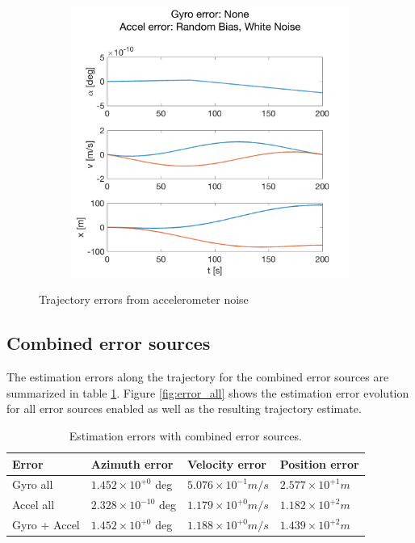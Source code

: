 \documentclass{article}
\newcommand{\e}[1]{\times 10^{#1}} %
\begin{document}
\begin{figure}[H]
\begin{subfigure}[t]{0.49\textwidth}
        \caption{}
    \end{subfigure}
    ~
    \begin{subfigure}[t]{0.49\textwidth}
        \centering
        \includegraphics[width=\textwidth]{fig/accel_all}
        \caption{}
    \end{subfigure}
    \caption{Trajectory errors from accelerometer noise}
    \label{fig:error_accel}
\end{figure}

\subsection*{Combined error sources}

The estimation errors along the trajectory for the combined error sources are summarized in table \ref{tab:combined_err}.
Figure \ref{fig:error_all} shows the estimation error evolution for all error sources enabled as well as the resulting trajectory estimate.

\begin{table}[h]
\centering
\begin{tabular}{llll}
Error  & Azimuth error & Velocity error & Position error \\
\hline
Gyro all & $1.452\e{+0}$ deg & $5.076\e{-1} \si{m/s}$ & $2.577\e{+1} \si{m}$ \\
Accel all & $2.328\e{-10}$ deg & $1.179\e{+0} \si{m/s}$ & $1.182\e{+2} \si{m}$ \\
Gyro + Accel & $1.452\e{+0}$ deg & $1.188\e{+0} \si{m/s}$ & $1.439\e{+2} \si{m}$
\end{tabular}
\caption{Estimation errors with combined error sources.}
\label{tab:combined_err}
\end{table}
\end{document}

